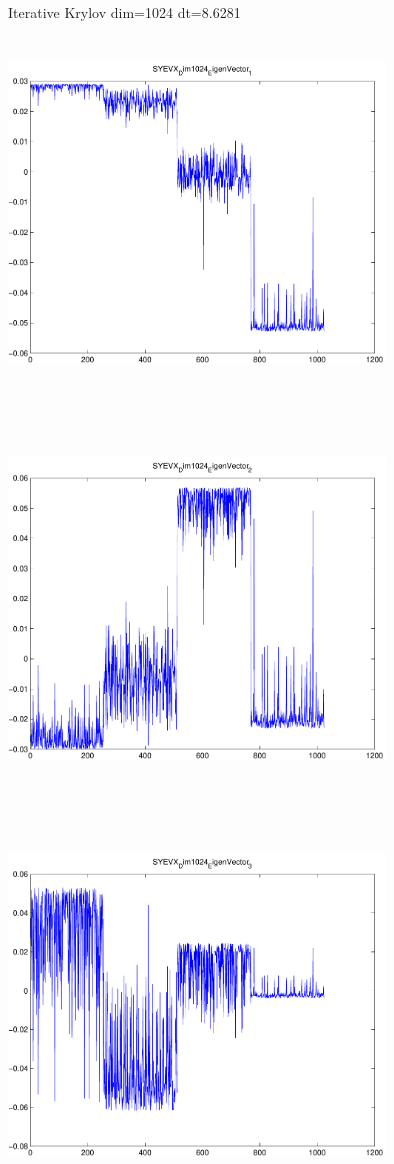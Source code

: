 \documentclass[9pt]{article}
\theoremstyle{plain}
\theoremstyle{definition}
\theoremstyle{remark}
\numberwithin{equation}{section}
\begin{document}
Iterative Krylov dim=1024 dt=8.6281
\includegraphics[width=10.0cm,height=10.0cm]{SYEVX_Dim1024_EigenVector_1.pdf}

\includegraphics[width=10.0cm,height=10.0cm]{SYEVX_Dim1024_EigenVector_2.pdf}

\includegraphics[width=10.0cm,height=10.0cm]{SYEVX_Dim1024_EigenVector_3.pdf}
\end{document}

